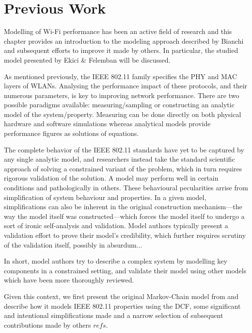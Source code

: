 
\chapter{Previous Work}

Modelling of Wi-Fi performance has been an active field of research and this
chapter provides an introduction to the modeling approach described by Bianchi
\cite{bianchi} and subsequent efforts to improve it made by others. In
particular, the studied model presented by Ekici \& Felemban \cite{felemban}
will be discussed.

As mentioned previously, the IEEE 802.11 family specifies the PHY and MAC
layers of WLANs. Analysing the performance impact of these protocols, and 
their numerous parameters, is key to improving network performance. There are
two possible paradigms available: measuring/sampling or constructing an
analytic model of the system/property. Measuring can be done directly on both
physical hardware and software simulations whereas analytical models provide
performance figures as solutions of equations.

The complete behavior of the IEEE 802.11 standards have yet to be captured by
any single analytic model, and researchers instead take the standard
scientific approach of solving a constrained variant of the problem, which in
turn requires rigorous validation of the solution. A model may perform well in
certain conditions and pathologically in others. These behavioural
pecularities arrise from simplification of system behaviour and properties. In
a given model, simplifications can also be inherent in the original
construction mechanism—the way the model itself was constructed—which forces
the model itself to undergo a sort of ironic self-analysis and validation.
Model authors typically present a validation effort to prove their model's
credibility, which further requires scrutiny of the validation itself,
possibly in absurdum...

In short, model authors try to describe a complex system by modelling key
components in a constrained setting, and validate their model using other
models which have been more thoroughly reviewed. 

Given this context, we first present the original Markov-Chain model from
\cite{bianchi} and describe how it models IEEE 802.11 properties using the
DCF, some significant and intentional simplifications made and a narrow
selection of subsequent contributions made by others $refs$. %

